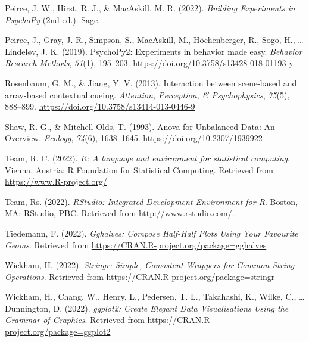 \documentclass[
  man,floatsintext]{apa7}
\newlength{\cslhangindent}
\newlength{\cslentryspacingunit} %
\newenvironment{CSLReferences}[2] %
 {%
  \setlength{\parindent}{0pt}
  \ifodd #1
  \let\oldpar\par
  \def\par{\hangindent=\cslhangindent\oldpar}
  \fi
  \setlength{\parskip}{#2\cslentryspacingunit}
 }%
 {}
\begin{document}
\begin{CSLReferences}{1}{0}
\leavevmode{}%
Peirce, J. W., Hirst, R. J., \& MacAskill, M. R. (2022). \emph{Building {Experiments} in {PsychoPy}} (2nd ed.). Sage.

\leavevmode{}%
Peirce, J., Gray, J. R., Simpson, S., MacAskill, M., Höchenberger, R., Sogo, H., \ldots{} Lindeløv, J. K. (2019). {PsychoPy2}: {Experiments} in behavior made easy. \emph{Behavior Research Methods}, \emph{51}(1), 195--203. \url{https://doi.org/10.3758/s13428-018-01193-y}

\leavevmode{}%
Rosenbaum, G. M., \& Jiang, Y. V. (2013). Interaction between scene-based and array-based contextual cueing. \emph{Attention, Perception, \& Psychophysics}, \emph{75}(5), 888--899. \url{https://doi.org/10.3758/s13414-013-0446-9}

\leavevmode{}%
Shaw, R. G., \& Mitchell-Olds, T. (1993). Anova for {Unbalanced} {Data}: {An} {Overview}. \emph{Ecology}, \emph{74}(6), 1638--1645. \url{https://doi.org/10.2307/1939922}

\leavevmode{}%
Team, R. C. (2022). \emph{R: {A} language and environment for statistical computing}. Vienna, Austria: R Foundation for Statistical Computing. Retrieved from \url{https://www.R-project.org/}

\leavevmode{}%
Team, Rs. (2022). \emph{{RStudio}: {Integrated} {Development} {Environment} for {R}}. Boston, MA: RStudio, PBC. Retrieved from \url{http://www.rstudio.com/.}

\leavevmode{}%
Tiedemann, F. (2022). \emph{Gghalves: {Compose} {Half}-{Half} {Plots} {Using} {Your} {Favourite} {Geoms}}. Retrieved from \url{https://CRAN.R-project.org/package=gghalves}

\leavevmode{}%
Wickham, H. (2022). \emph{Stringr: {Simple}, {Consistent} {Wrappers} for {Common} {String} {Operations}}. Retrieved from \url{https://CRAN.R-project.org/package=stringr}

\leavevmode{}%
Wickham, H., Chang, W., Henry, L., Pedersen, T. L., Takahashi, K., Wilke, C., \ldots{} Dunnington, D. (2022). \emph{ggplot2: {Create} {Elegant} {Data} {Visualisations} {Using} the {Grammar} of {Graphics}}. Retrieved from \url{https://CRAN.R-project.org/package=ggplot2}


\end{CSLReferences}
\end{document}
